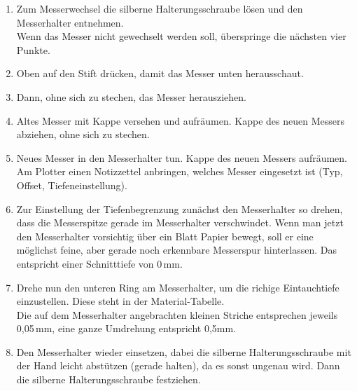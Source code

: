 \documentclass{\basedir/fablab-document}
\begin{document}
\begin{enumerate}
 \item Zum Messerwechsel die silberne Halterungsschraube lösen und den Messerhalter entnehmen. \\
       Wenn das Messer nicht gewechselt werden soll, überspringe die nächsten vier Punkte.
 \item Oben auf den Stift drücken, damit das Messer unten herausschaut. 
 \item Dann, ohne sich zu stechen, das Messer herausziehen. 
\item Altes Messer mit Kappe versehen und aufräumen. Kappe des neuen Messers abziehen, ohne sich zu stechen.
\item Neues Messer in den Messerhalter tun. Kappe des neuen Messers aufräumen.\\ Am Plotter einen Notizzettel anbringen, welches Messer eingesetzt ist (Typ, Offset, Tiefeneinstellung).
\item Zur Einstellung der Tiefenbegrenzung zunächst den Messerhalter so drehen, dass die Messerspitze gerade im Messerhalter verschwindet. Wenn man jetzt den Messerhalter vorsichtig über ein Blatt Papier bewegt, soll er eine möglichst feine, aber gerade noch erkennbare Messerspur hinterlassen. Das entspricht einer Schnitttiefe von 0\,mm. 
\item Drehe nun den unteren Ring am Messerhalter, um die richige Eintauchtiefe einzustellen. Diese steht in der Material-Tabelle. \\Die auf dem Messerhalter angebrachten kleinen Striche entsprechen jeweils 0,05\,mm, eine ganze Umdrehung entspricht 0,5mm.

\item Den Messerhalter wieder einsetzen, dabei die silberne Halterungsschraube mit der Hand leicht abstützen (gerade halten), da es sonst ungenau wird. Dann die silberne Halterungsschraube festziehen.
\end{enumerate}
\end{document}
